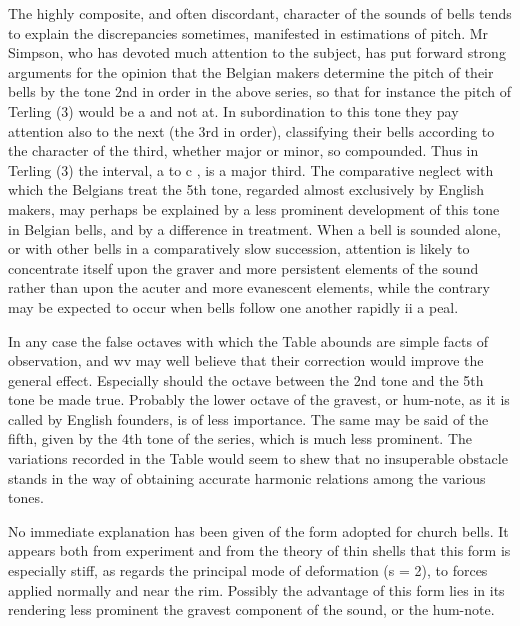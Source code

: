The highly composite, and often discordant, character of the sounds of bells
tends to explain the discrepancies sometimes, manifested in estimations of
pitch. Mr Simpson, who has devoted much attention to the subject, has put
forward strong arguments for the opinion that the Belgian makers determine the
pitch of their bells by the tone 2nd in order in the above series, so that for
instance the pitch of Terling (3) would be a and not at. In subordination to
this tone they pay attention also to the next (the 3rd in order), classifying
their bells according to the character
of the third, whether
major or minor, so compounded. Thus in Terling (3) the interval, a to c , is a
major third. The comparative neglect with which the Belgians treat the 5th
tone, regarded almost exclusively by English makers, may perhaps be explained
by a less prominent development of this tone in Belgian bells, and by a
difference in treatment. When a bell is sounded alone, or with other bells in
a comparatively slow succession, attention is likely to concentrate itself upon
the graver and more persistent elements of the sound rather than upon the
acuter and more evanescent elements, while the contrary may be expected to
occur when bells follow one another rapidly ii a peal.

In any case the false octaves with which the Table abounds are simple facts of
observation, and wv may well believe that their correction would improve the
general effect. Especially should the octave between the 2nd tone and the 5th
tone be made true.  Probably the lower octave of the gravest, or hum-note, as
it is called by English founders, is of less importance. The same may be said
of the fifth, given by the 4th tone of the series, which is much less
prominent. The variations recorded in the Table would seem to shew that no
insuperable obstacle stands in the way of obtaining accurate harmonic relations
among the various tones.

No immediate explanation has been given of the form adopted for church bells.
It appears both from experiment and from the theory of thin shells that this
form is especially stiff, as regards the principal mode of deformation (s = 2),
to forces applied normally and near the rim. Possibly the advantage of this form
lies in its rendering less prominent the gravest component of the sound, or the
hum-note.

